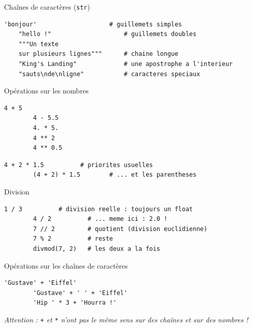 \documentclass{beamer}
\begin{document}
\begin{frame}[fragile]{Chaînes de caractères (\texttt{str})}
	\begin{lstlisting}[style=python]
	'bonjour'                    # guillemets simples
	"hello !"                    # guillemets doubles
	"""Un texte
	sur plusieurs lignes"""      # chaine longue
	"King's Landing"             # une apostrophe a l'interieur
	"sauts\nde\nligne"           # caracteres speciaux
	\end{lstlisting}
\end{frame}



\begin{frame}[fragile]{Opérations sur les nombres}
	\begin{lstlisting}[style=python]
		4 + 5
		4 - 5.5
		4. * 5.
		4 ** 2
		4 ** 0.5
	\end{lstlisting}
	\bigskip
	\begin{lstlisting}[style=python]
		4 + 2 * 1.5          # priorites usuelles
		(4 + 2) * 1.5        # ... et les parentheses
	\end{lstlisting}
\end{frame}

\begin{frame}[fragile]{Division}
	\begin{lstlisting}[style=python]
		1 / 3          # division reelle : toujours un float
		4 / 2          # ... meme ici : 2.0 !
		7 // 2         # quotient (division euclidienne)
		7 % 2          # reste
		divmod(7, 2)   # les deux a la fois
	\end{lstlisting}
\end{frame}

\begin{frame}[fragile]{Opérations sur les chaînes de caractères}
	\begin{lstlisting}[style=python]
		'Gustave' + 'Eiffel'
		'Gustave' + ' ' + 'Eiffel'
		'Hip ' * 3 + 'Hourra !'
	\end{lstlisting}
	\bigskip
	\begin{center}
		\emph{Attention : \texttt{+} et \texttt{*} n'ont pas le même sens sur des chaînes et sur des nombres !}
	\end{center}
\end{frame}


\end{document}
